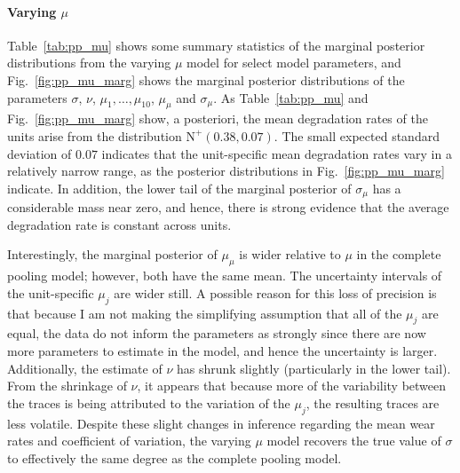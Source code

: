 \paragraph{Varying $\mu$} Table~\ref{tab:pp_mu} shows some summary statistics of the marginal posterior distributions from the varying $\mu$ model for select model parameters, and Fig.~\ref{fig:pp_mu_marg} shows the marginal posterior distributions of the parameters $\sigma$, $\nu$, $\mu_1, \ldots, \mu_{10}$, $\mu_{\mu}$ and $\sigma_{\mu}$. As Table~\ref{tab:pp_mu} and Fig.~\ref{fig:pp_mu_marg} show, a posteriori, the mean degradation rates of the units arise from the distribution $\mbox{N}^{+}(0.38, 0.07)$. The small expected standard deviation of $0.07$ indicates that the unit-specific mean degradation rates vary in a relatively narrow range, as the posterior distributions in Fig.~\ref{fig:pp_mu_marg} indicate. In addition, the lower tail of the marginal posterior of $\sigma_\mu$ has a considerable mass near zero, and hence, there is strong evidence that the average degradation rate is constant across units. 

Interestingly, the marginal posterior of $\mu_\mu$ is wider relative to $\mu$ in the complete pooling model; however, both have the same mean. The uncertainty intervals of the unit-specific $\mu_j$ are wider still. A possible reason for this loss of precision is that because I am not making the simplifying assumption that all of the $\mu_j$ are equal, the data do not inform the parameters as strongly since there are now more parameters to estimate in the model, and hence the uncertainty is larger. Additionally, the estimate of $\nu$ has shrunk slightly (particularly in the lower tail). From the shrinkage of $\nu$, it appears that because more of the variability between the traces is being attributed to the variation of the $\mu_j$, the resulting traces are less volatile. Despite these slight changes in inference regarding the mean wear rates and coefficient of variation, the varying $\mu$ model recovers the true value of $\sigma$ to effectively the same degree as the complete pooling model.



